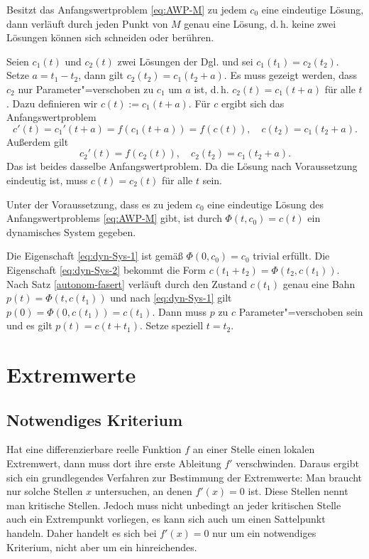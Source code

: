 \begin{theorem}\label{autonom-fasert}
Besitzt das Anfangswertproblem \eqref{eq:AWP-M} zu jedem $c_0$ eine
eindeutige Lösung, dann verläuft durch jeden Punkt von $M$ genau
eine Lösung, d.\,h. keine zwei Lösungen können sich schneiden
oder berühren.
\end{theorem}
\noindent{}
Seien $c_1(t)$ und $c_2(t)$ zwei Lösungen der Dgl. und sei
$c_1(t_1)=c_2(t_2)$. Setze $a=t_1-t_2$, dann gilt $c_2(t_2)=c_1(t_2+a)$.
Es muss gezeigt werden, dass $c_2$ nur Parameter"=verschoben
zu $c_1$ um $a$ ist, d.\,h. $c_2(t)=c_1(t+a)$ für alle $t$. Dazu
definieren wir $c(t):=c_1(t+a)$. Für $c$ ergibt sich das
Anfangswertproblem
\begin{equation}
c'(t) = c_1'(t+a) = f(c_1(t+a)) = f(c(t)),\quad c(t_2)=c_1(t_2+a).
\end{equation}
Außerdem gilt
\begin{equation}
c_2'(t) = f(c_2(t)), \quad c_2(t_2)=c_1(t_2+a).
\end{equation}
Das ist beides dasselbe Anfangswertproblem. Da die Lösung nach
Voraussetzung eindeutig ist, muss $c(t)=c_2(t)$
für alle $t$ sein.\;\qedsymbol

\begin{theorem}
Unter der Voraussetzung, dass es zu jedem $c_0$ eine eindeutige
Lösung des Anfangswertproblems \eqref{eq:AWP-M} gibt, ist durch
$\Phi(t,c_0)=c(t)$ ein dynamisches System gegeben.
\end{theorem}
\noindent{}
Die Eigenschaft \eqref{eq:dyn-Sys-1} ist gemäß $\Phi(0,c_0)=c_0$
trivial erfüllt. Die Eigenschaft \eqref{eq:dyn-Sys-2} bekommt
die Form $c(t_1+t_2)=\Phi(t_2,c(t_1))$. Nach Satz
\ref{autonom-fasert} verläuft durch den Zustand $c(t_1)$ genau
eine Bahn $p(t)=\Phi(t,c(t_1))$ und nach \eqref{eq:dyn-Sys-1} gilt
$p(0)=\Phi(0,c(t_1))=c(t_1)$. Dann muss $p$ zu $c$ Parameter"=verschoben
sein und es gilt $p(t)=c(t+t_1)$. Setze speziell $t=t_2$.\;\qedsymbol

\newpage
\section{Extremwerte}

\subsection{Notwendiges Kriterium}

Hat eine differenzierbare reelle Funktion $f$ an einer Stelle einen
lokalen Extremwert, dann muss dort ihre erste Ableitung $f'$
verschwinden. Daraus ergibt sich ein grundlegendes Verfahren zur
Bestimmung der Extremwerte: Man braucht nur solche Stellen $x$
untersuchen, an denen $f'(x)=0$ ist. Diese Stellen nennt man
kritische Stellen. Jedoch muss nicht unbedingt an jeder kritischen
Stelle auch ein Extrempunkt vorliegen, es kann sich auch um einen
Sattelpunkt handeln. Daher handelt es sich bei $f'(x)=0$ nur um
ein notwendiges Kriterium, nicht aber um ein hinreichendes.

